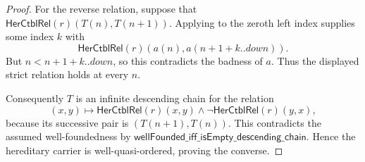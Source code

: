 \begin{proof}
For the reverse relation, suppose that
$\mathsf{HerCtblRel}(r)(T(n),T(n+1))$.  Applying
 to the zeroth left index supplies some index $k$
with
\[
 \mathsf{HerCtblRel}(r)(a(n),a(n+1+k.\mathord{.down})).
\]
But $n<n+1+k.\mathord{.down}$, so this contradicts the badness of $a$.
Thus the displayed strict relation holds at every $n$.

Consequently $T$ is an infinite descending chain for the relation
\[
 (x,y)\longmapsto
 \mathsf{HerCtblRel}(r)(x,y)\mathbin{\wedge}
 \neg\mathsf{HerCtblRel}(r)(y,x),
\]
because its successive pair is $(T(n+1),T(n))$.  This contradicts the
assumed well-foundedness by
$\mathsf{wellFounded\_iff\_isEmpty\_descending\_chain}$.  Hence the
hereditary carrier is well-quasi-ordered, proving the converse.
\end{proof}
